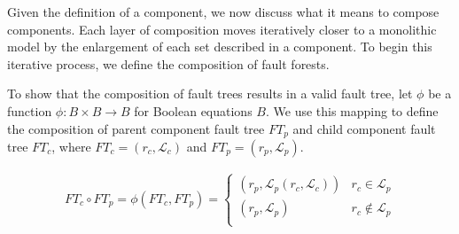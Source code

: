 Given the definition of a component, we now discuss what it means to compose components. Each layer of composition moves iteratively closer to a monolithic model by the enlargement of each set described in a component. To begin this iterative process, we define the composition of fault forests. 


To show that the composition of fault trees results in a valid fault tree, let $\phi$ be a function $\phi : B \times B \rightarrow B$ for Boolean equations $B$. We use this mapping to define the composition of parent component fault tree $\mathit{FT_p}$ and child component fault tree $\mathit{FT_c}$, where $\mathit{FT}_c = (r_c, \mathcal{L}_c)$ and $\mathit{FT}_p = (r_p, \mathcal{L}_p)$.

\begin{gather}
\mathit{FT}_c \circ \mathit{FT}_p = \phi(\mathit{FT}_c, \mathit{FT}_p) =\begin{cases} 
      (r_p, \mathcal{L}_p(r_c, \mathcal{L}_c)) & r_c \in \mathcal{L}_p \\
      (r_p, \mathcal{L}_p) & r_c \not\in \mathcal{L}_p \\
   \end{cases}
\label{eq:phi}
\end{gather}

